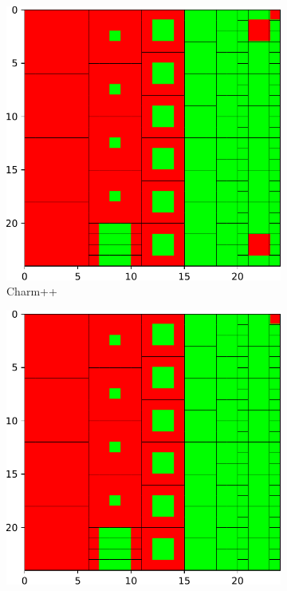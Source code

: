 
\begin{figure}
\begin{subfigure}[b]{0.33\textwidth}
\includegraphics[width=\textwidth]{img/Charm-correctness}
\caption{
Charm++
}
\label{fig:charm_correctness}
\end{subfigure}%
\begin{subfigure}[b]{0.33\textwidth}
  \includegraphics[width=\textwidth]{img/MPI-n1-correctness}

\end{subfigure}
\end{figure}
